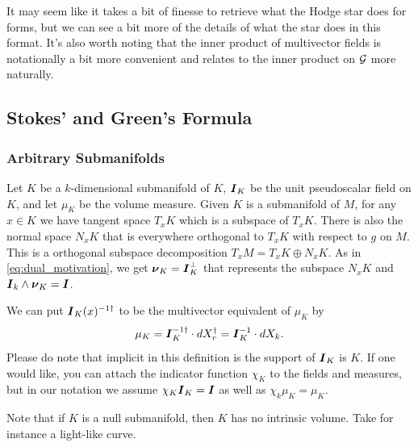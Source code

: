 \documentclass{article}
\begin{document}
\begin{remark}
It may seem like it takes a bit of finesse to retrieve what the Hodge star does for forms, but we can see a bit more of the details of what the star does in this format. It's also worth noting that the inner product of multivector fields is notationally a bit more convenient and relates to the inner product on $\mathcal{G}$ more naturally.
\end{remark}

\subsection{Stokes' and Green's Formula}


\subsubsection{Arbitrary Submanifolds}
Let $K$ be a $k$-dimensional submanifold of $K$, $\boldsymbol{I}_K$ be the unit pseudoscalar field on $K$, and let $\mu_K$ be the volume measure. Given $K$ is a submanifold of $M$, for any $x \in K$ we have tangent space $T_x K$ which is a subspace of $T_x K$. There is also the normal space $N_x K$ that is everywhere orthogonal to $T_x K$ with respect to $g$ on $M$. This is a orthogonal subspace decomposition $T_x M = T_x K \oplus N_x K$. As in \cref{eq:dual_motivation}, we get $\boldsymbol{\nu}_K = \boldsymbol{I}_K^\perp$ that represents the subspace $N_x K$ and $\boldsymbol{I}_k \wedge \boldsymbol{\nu}_K = \boldsymbol{I}$.

We can put $\boldsymbol{I}_K(x)^{-1 \dagger}$ to be the multivector equivalent of $\mu_K$ by
\begin{equation}
\label{eq:submanifold_volume_form}
\mu_K = \boldsymbol{I}_K^{-1 \dagger} \cdot dX_r^\dagger = \boldsymbol{I}_K^{-1} \cdot dX_k.
\end{equation}
Please do note that implicit in this definition is the support of $\boldsymbol{I}_K$ is $K$. If one would like, you can attach the indicator function $\chi_K$ to the fields and measures, but in our notation we assume $\chi_K \boldsymbol{I}_K = \boldsymbol{I}$ as well as $\chi_k \mu_K = \mu_K$. 

\begin{remark}
Note that if $K$ is a null submanifold, then $K$ has no intrinsic volume. Take for instance a light-like curve.
\end{remark}
\end{document}
